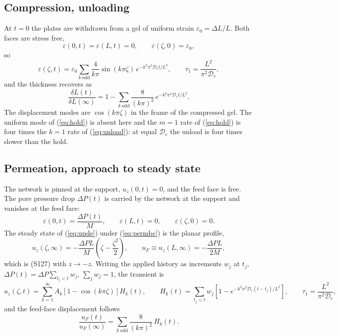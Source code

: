 \documentclass[11pt]{article}
\begin{document}
\subsection{Compression, unloading}

At $t = 0$ the plates are withdrawn from a gel of uniform strain $\varepsilon_0 = \Delta L/L$. Both faces are stress free,
\begin{equation}
\varepsilon(0,t) = \varepsilon(L,t) = 0, \qquad \varepsilon(\zeta,0) = \varepsilon_0,
\label{eq:unloadbc}
\end{equation}
so
\begin{equation}
\varepsilon(\zeta,t) = \varepsilon_0 \sum_{k\ \mathrm{odd}} \frac{4}{k\pi} \sin(k\pi\zeta)\, e^{-k^2\pi^2 \mathcal{D}_c t/L^2},
\qquad \tau_1 = \frac{L^2}{\pi^2 \mathcal{D}_c},
\label{eq:unload}
\end{equation}
and the thickness recovers as
\begin{equation}
\frac{\delta L(t)}{\delta L(\infty)} = 1 - \sum_{k\ \mathrm{odd}} \frac{8}{(k\pi)^2}\, e^{-k^2\pi^2 \mathcal{D}_c t/L^2}.
\label{eq:unloadtrace}
\end{equation}
The displacement modes are $\cos(k\pi\zeta)$ in the frame of the compressed gel. The uniform mode of (\ref{eq:hold}) is absent here and the $m = 1$ rate of (\ref{eq:hold}) is four times the $k = 1$ rate of (\ref{eq:unload}): at equal $\mathcal{D}_c$ the unload is four times slower than the hold.

\subsection{Permeation, approach to steady state}

The network is pinned at the support, $u_z(0,t) = 0$, and the feed face is free. The pore pressure drop $\Delta P(t)$ is carried by the network at the support and vanishes at the feed face:
\begin{equation}
\varepsilon(0,t) = \frac{\Delta P(t)}{M}, \qquad \varepsilon(L,t) = 0, \qquad \varepsilon(\zeta,0) = 0.
\label{eq:permbc}
\end{equation}
The steady state of (\ref{eq:upde}) under (\ref{eq:permbc}) is the planar profile,
\begin{equation}
u_z(\zeta,\infty) = -\frac{\Delta P L}{M}\left(\zeta - \frac{\zeta^2}{2}\right), \qquad u_F \equiv u_z(L,\infty) = -\frac{\Delta P L}{2M},
\label{eq:permss}
\end{equation}
which is (S127) with $z \to -z$. Writing the applied history as increments $w_j$ at $t_j$, $\Delta P(t) = \Delta P \sum_{t_j < t} w_j$, $\sum_j w_j = 1$, the transient is
\begin{equation}
u_z(\zeta,t) = \sum_{k=1}^{\infty} A_k \left[1 - \cos(k\pi\zeta)\right] H_k(t), \qquad
H_k(t) = \sum_{t_j < t} w_j \left[1 - e^{-k^2\pi^2 \mathcal{D}_c (t - t_j)/L^2}\right],
\qquad \tau_1 = \frac{L^2}{\pi^2 \mathcal{D}_c},
\label{eq:perm}
\end{equation}
and the feed-face displacement follows
\begin{equation}
\frac{u_F(t)}{u_F(\infty)} = \sum_{k\ \mathrm{odd}} \frac{8}{(k\pi)^2}\, H_k(t).
\label{eq:permtrace}
\end{equation}
\end{document}
